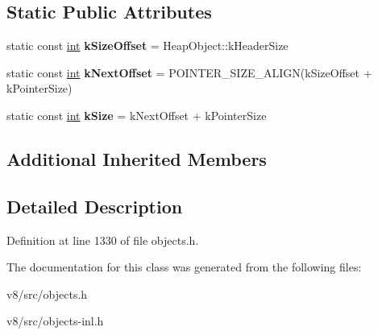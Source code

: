 \subsection*{Static Public Attributes}
\begin{DoxyCompactItemize}
\item 
\mbox{\label{classv8_1_1internal_1_1FreeSpace_a7fd33f05c7a8d5417c28228c73f8608a}} 
static const \mbox{\hyperlink{classint}{int}} {\bfseries k\+Size\+Offset} = Heap\+Object\+::k\+Header\+Size
\item 
\mbox{\label{classv8_1_1internal_1_1FreeSpace_a16df757f9e0a708e78211a0ba872eaae}} 
static const \mbox{\hyperlink{classint}{int}} {\bfseries k\+Next\+Offset} = P\+O\+I\+N\+T\+E\+R\+\_\+\+S\+I\+Z\+E\+\_\+\+A\+L\+I\+GN(k\+Size\+Offset + k\+Pointer\+Size)
\item 
\mbox{\label{classv8_1_1internal_1_1FreeSpace_aed878e2a659e31ccfe1479f0f7ffa8a9}} 
static const \mbox{\hyperlink{classint}{int}} {\bfseries k\+Size} = k\+Next\+Offset + k\+Pointer\+Size
\end{DoxyCompactItemize}
\subsection*{Additional Inherited Members}


\subsection{Detailed Description}


Definition at line 1330 of file objects.\+h.



The documentation for this class was generated from the following files\+:\begin{DoxyCompactItemize}
\item 
v8/src/objects.\+h\item 
v8/src/objects-\/inl.\+h\end{DoxyCompactItemize}
